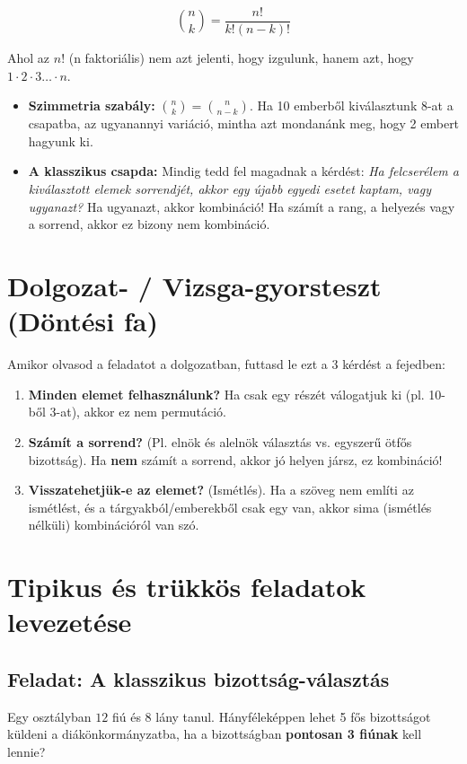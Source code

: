 \documentclass[11pt,a4paper]{article}
\begin{document}
$$\binom{n}{k} = \frac{n!}{k!(n-k)!}$$

Ahol az $n!$ (n faktoriális) nem azt jelenti, hogy izgulunk, hanem azt, hogy $1 \cdot 2 \cdot 3 \dots \cdot n$.

\begin{tcolorbox}[title=Hasznos tulajdonságok és csapdák]
\begin{itemize}
    \item \textbf{Szimmetria szabály:} $\binom{n}{k} = \binom{n}{n-k}$. Ha 10 emberből kiválasztunk 8-at a csapatba, az ugyanannyi variáció, mintha azt mondanánk meg, hogy 2 embert hagyunk ki.
    \item \textbf{A klasszikus csapda:} Mindig tedd fel magadnak a kérdést: \textit{Ha felcserélem a kiválasztott elemek sorrendjét, akkor egy újabb egyedi esetet kaptam, vagy ugyanazt?} Ha ugyanazt, akkor kombináció! Ha számít a rang, a helyezés vagy a sorrend, akkor ez bizony nem kombináció.
\end{itemize}
\end{tcolorbox}

\section{Dolgozat- / Vizsga-gyorsteszt (Döntési fa)}
Amikor olvasod a feladatot a dolgozatban, futtasd le ezt a 3 kérdést a fejedben:
\begin{enumerate}
    \item \textbf{Minden elemet felhasználunk?} Ha csak egy részét válogatjuk ki (pl. 10-ből 3-at), akkor ez nem permutáció.
    \item \textbf{Számít a sorrend?} (Pl. elnök és alelnök választás vs. egyszerű ötfős bizottság). Ha \textbf{nem} számít a sorrend, akkor jó helyen jársz, ez kombináció!
    \item \textbf{Visszatehetjük-e az elemet?} (Ismétlés). Ha a szöveg nem említi az ismétlést, és a tárgyakból/emberekből csak egy van, akkor sima (ismétlés nélküli) kombinációról van szó.
\end{enumerate}

\section{Tipikus és trükkös feladatok levezetése}

\subsection*{Feladat: A klasszikus bizottság-választás}
\begin{tcolorbox}
Egy osztályban $12$ fiú és $8$ lány tanul. Hányféleképpen lehet 5 fős bizottságot küldeni a diákönkormányzatba, ha a bizottságban \textbf{pontosan 3 fiúnak} kell lennie?
\end{tcolorbox}
\end{document}
